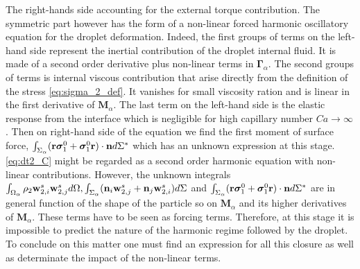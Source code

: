 The right-hands side accounting for the external torque contribution. 
The symmetric part however has the form of a non-linear forced harmonic oscillatory equation for the droplet deformation. 
Indeed, the first groups of terms on the left-hand side represent the inertial contribution of the droplet internal fluid. 
It is made of a second order derivative plus non-linear terms in $\bm\Gamma_\alpha$. 
The second groups of terms is internal viscous contribution that arise directly from the definition of the stress \ref{eq:sigma_2_def}. 
It vanishes for small viscosity ration and is linear in the first derivative of $\textbf{M}_\alpha$. 
The last term on the left-hand side is the elastic response from the interface which is negligible for high capillary number $Ca \to \infty$. 
Then on right-hand side of the equation we find the first moment of surface force, $\int_{\Sigma_\alpha} (\textbf{r}\bm\sigma_1^0+ \bm\sigma_1^0\textbf{r})\cdot \textbf{n} d\Sigma^*$ which has an unknown expression at this stage. 
\ref{eq:dt2_C} might be regarded as a second order harmonic equation with non-linear contributions. 
However, the unknown integrals $\int_{\Omega_\alpha} \rho_2 \textbf{w}_{2,i}^s\textbf{w}_{2,j}^s d\Omega,
\int_{\Sigma_\alpha} (\textbf{n}_i \textbf{w}_{2,j}^s + \textbf{n}_j \textbf{w}_{2,i}^s) d\Sigma$ and $\int_{\Sigma_\alpha} (\textbf{r}\bm\sigma_1^0+ \bm\sigma_1^0\textbf{r})\cdot \textbf{n} d\Sigma^*$ are in general function of the shape of the particle so on $\textbf{M}_\alpha$ and its higher derivatives of $\textbf{M}_\alpha$.
These terms have to be seen as forcing terms. 
Therefore, at this stage it is impossible to predict the nature of the harmonic regime followed by the droplet. 
To conclude on this matter one must find an expression for all this closure as well as determinate the impact of the non-linear terms.



